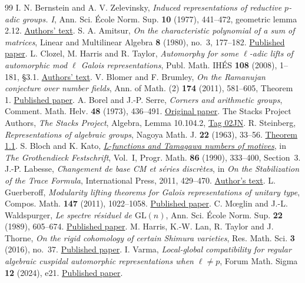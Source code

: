 \documentclass[a4paper,11pt]{article}
\theoremstyle{definition}
\theoremstyle{remark}
\numberwithin{equation}{section}
\begin{document}
\begin{thebibliography}{99}
 I. N. Bernstein and A. V. Zelevinsky, \emph{Induced representations of reductive \(p\)-adic groups. I}, Ann. Sci. \'Ecole Norm. Sup. \textbf{10} (1977), 441--472, geometric lemma 2.12. \href{https://www.math.tau.ac.il/~bernstei/Publication_list/publication_texts/BZ-induced-1.pdf}{Authors' text}.
 S. A. Amitsur, \emph{On the characteristic polynomial of a sum of matrices}, Linear and Multilinear Algebra \textbf{8} (1980), no.~3, 177--182. \href{https://doi.org/10.1080/03081088008817315}{Published paper}.
 L. Clozel, M. Harris and R. Taylor, \emph{Automorphy for some \(\ell\)-adic lifts of automorphic mod \(\ell\) Galois representations}, Publ. Math. IH\'ES \textbf{108} (2008), 1--181, \S3.1. \href{https://virtualmath1.stanford.edu/~rltaylor/twugfin.pdf}{Authors' text}.
 V. Blomer and F. Brumley, \emph{On the Ramanujan conjecture over number fields}, Ann. of Math. (2) \textbf{174} (2011), 581--605, Theorem 1. \href{https://annals.math.princeton.edu/2011/174-1/p18}{Published paper}.
 A. Borel and J.-P. Serre, \emph{Corners and arithmetic groups}, Comment. Math. Helv. \textbf{48} (1973), 436--491. \href{https://www.e-periodica.ch/cntmng?pid=com-001:1973:48::32}{Original paper}.
 The Stacks Project Authors, \emph{The Stacks Project}, Algebra, Lemma 10.104.2, \href{https://stacks.math.columbia.edu/tag/02JN}{Tag 02JN}.
 R. Steinberg, \emph{Representations of algebraic groups}, Nagoya Math. J. \textbf{22} (1963), 33--56. \href{https://doi.org/10.1017/S0027763000011016}{Theorem 1.1}.
 S. Bloch and K. Kato, \href{https://virtualmath1.stanford.edu/~conrad/BSDseminar/refs/BKTamagawa.pdf}{\emph{L-functions and Tamagawa numbers of motives}}, in \emph{The Grothendieck Festschrift}, Vol.~I, Progr. Math. \textbf{86} (1990), 333--400, Section~3.
 J.-P. Labesse, \emph{Changement de base CM et séries discrètes}, in \emph{On the Stabilization of the Trace Formula}, International Press, 2011, 429--470. \href{https://webusers.imj-prg.fr/~michael.harris/CBCM.pdf}{Author's text}.
 L. Guerberoff, \emph{Modularity lifting theorems for Galois representations of unitary type}, Compos. Math. \textbf{147} (2011), 1022--1058. \href{https://doi.org/10.1112/S0010437X10005154}{Published paper}.
 C. M{\oe}glin and J.-L. Waldspurger, \emph{Le spectre résiduel de \(\mathrm{GL}(n)\)}, Ann. Sci. École Norm. Sup. \textbf{22} (1989), 605--674. \href{https://www.numdam.org/articles/10.24033/asens.1595/}{Published paper}.
 M. Harris, K.-W. Lan, R. Taylor and J. Thorne, \emph{On the rigid cohomology of certain Shimura varieties}, Res. Math. Sci. \textbf{3} (2016), no.~37. \href{https://doi.org/10.1186/s40687-016-0078-5}{Published paper}.
 I. Varma, \emph{Local-global compatibility for regular algebraic cuspidal automorphic representations when \(\ell\ne p\)}, Forum Math. Sigma \textbf{12} (2024), e21. \href{https://doi.org/10.1017/fms.2024.7}{Published paper}.
\end{thebibliography}\endgroup
\end{document}
